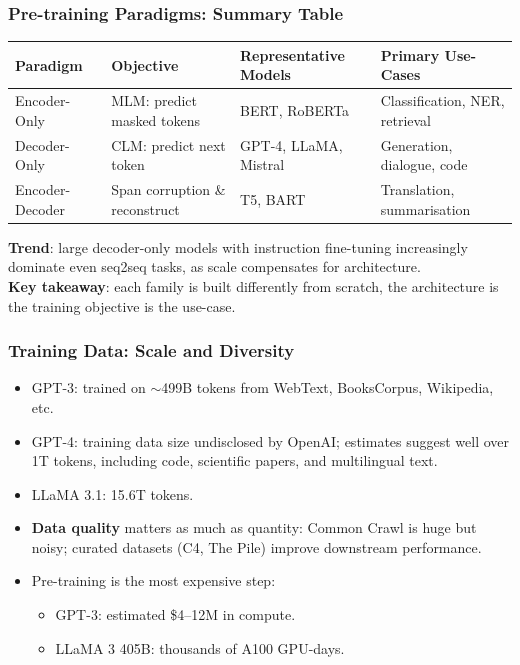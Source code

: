 \begin{frame}[fragile]\frametitle{Pre-training Paradigms: Summary Table}
\begin{center}
\small
\renewcommand{\arraystretch}{1.3}
\begin{tabular}{|p{2cm}|p{2cm}|p{2cm}|p{2cm}|}
\hline
\textbf{Paradigm} & \textbf{Objective} & \textbf{Representative Models} & \textbf{Primary Use-Cases} \\
\hline
Encoder-Only & MLM: predict masked tokens & BERT, RoBERTa & Classification, NER, retrieval \\
\hline
Decoder-Only & CLM: predict next token & GPT-4, LLaMA, Mistral & Generation, dialogue, code \\
\hline
Encoder-Decoder & Span corruption \& reconstruct & T5, BART & Translation, summarisation \\
\hline
\end{tabular}
\end{center}

\vspace{0.4em}
\textbf{Trend}: large decoder-only models with instruction fine-tuning increasingly dominate even seq2seq tasks, as scale compensates for architecture.\\[0.3em]
\textbf{Key takeaway}: each family is built differently from scratch,  the architecture is the training objective is the use-case.
\end{frame}

\begin{frame}[fragile]\frametitle{Training Data: Scale and Diversity}
\begin{itemize}
\item GPT-3: trained on $\sim$499B tokens from WebText, BooksCorpus, Wikipedia, etc.
\item GPT-4: training data size undisclosed by OpenAI; estimates suggest well over 1T tokens, including code, scientific papers, and multilingual text.
\item LLaMA 3.1: 15.6T tokens.
\item \textbf{Data quality} matters as much as quantity: Common Crawl is huge but noisy; curated datasets (C4, The Pile) improve downstream performance.
\item Pre-training is the most expensive step:
  \begin{itemize}
  \item GPT-3: estimated \$4–12M in compute.
  \item LLaMA 3 405B: thousands of A100 GPU-days.
  \end{itemize}
\end{itemize}
\end{frame}


